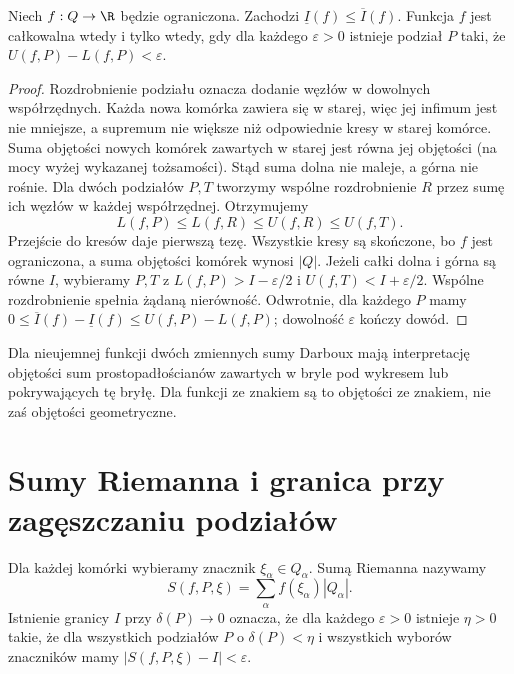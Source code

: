 \begin{stwierdzenie}
\label{ma2:prop:darboux-box}
Niech $f:Q\to\R$ będzie ograniczona.
Zachodzi $\underline I(f)\le\overline I(f)$.
Funkcja $f$ jest całkowalna wtedy
i tylko wtedy, gdy dla każdego $\varepsilon>0$
istnieje podział $P$ taki, że
$U(f,P)-L(f,P)<\varepsilon$.
\end{stwierdzenie}
\begin{proof}
Rozdrobnienie podziału oznacza dodanie węzłów
w dowolnych współrzędnych. Każda nowa komórka
zawiera się w starej, więc jej infimum jest nie
mniejsze, a supremum nie większe niż odpowiednie
kresy w starej komórce. Suma objętości nowych
komórek zawartych w starej jest równa jej
objętości (na mocy wyżej wykazanej tożsamości).
Stąd suma dolna nie maleje, a górna nie rośnie.
Dla dwóch podziałów $P,T$ tworzymy wspólne
rozdrobnienie $R$ przez sumę ich węzłów w każdej
współrzędnej. Otrzymujemy
\[
 L(f,P)\le L(f,R)\le U(f,R)\le U(f,T).
\]
Przejście do kresów daje pierwszą tezę.
Wszystkie kresy są skończone, bo $f$ jest ograniczona,
a suma objętości komórek wynosi $|Q|$.
Jeżeli całki dolna i górna są równe $I$, wybieramy
$P,T$ z $L(f,P)>I-\varepsilon/2$ i
$U(f,T)<I+\varepsilon/2$. Wspólne rozdrobnienie
spełnia żądaną nierówność.
Odwrotnie, dla każdego $P$ mamy
$0\le\overline I(f)-\underline I(f)
\le U(f,P)-L(f,P)$; dowolność $\varepsilon$
kończy dowód.
\end{proof}

Dla nieujemnej funkcji dwóch zmiennych sumy
Darboux mają interpretację objętości sum
prostopadłościanów zawartych w bryle pod wykresem
lub pokrywających tę bryłę.
Dla funkcji ze znakiem są to objętości ze znakiem,
nie zaś objętości geometryczne.

\section{Sumy Riemanna i granica przy zagęszczaniu podziałów}

\begin{definicja}
\label{ma2:def:riemann-box-sum}
Dla każdej komórki wybieramy znacznik
$\xi_\alpha\in Q_\alpha$. Sumą Riemanna nazywamy
\[
 S(f,P,\xi)=\sum_\alpha f(\xi_\alpha)|Q_\alpha|.
\]
Istnienie granicy $I$ przy $\delta(P)\to0$ oznacza,
że dla każdego $\varepsilon>0$ istnieje $\eta>0$
takie, że dla wszystkich podziałów $P$ o
$\delta(P)<\eta$ i wszystkich wyborów znaczników
mamy $|S(f,P,\xi)-I|<\varepsilon$.
\end{definicja}

